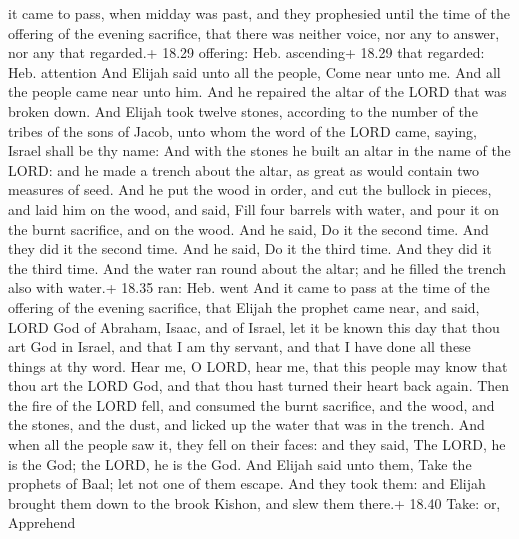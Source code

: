 it came to pass, when midday was past, and they prophesied until the
time of the offering of the evening sacrifice, that there was neither
voice, nor any to answer, nor any that regarded.+ 18.29 offering: Heb.
ascending+ 18.29 that regarded: Heb. attention  And Elijah
said unto all the people, Come near unto me. And all the people came
near unto him. And he repaired the altar of the LORD that was broken
down.  And Elijah took twelve stones, according to the
number of the tribes of the sons of Jacob, unto whom the word of the
LORD came, saying, Israel shall be thy name:  And with the
stones he built an altar in the name of the LORD: and he made a trench
about the altar, as great as would contain two measures of seed.
 And he put the wood in order, and cut the bullock in
pieces, and laid him on the wood, and said, Fill four barrels with
water, and pour it on the burnt sacrifice, and on the wood.
 And he said, Do it the second time. And they did it the
second time. And he said, Do it the third time. And they did it the
third time.  And the water ran round about the altar; and
he filled the trench also with water.+ 18.35 ran: Heb. went
 And it came to pass at the time of the offering of the
evening sacrifice, that Elijah the prophet came near, and said, LORD God
of Abraham, Isaac, and of Israel, let it be known this day that thou art
God in Israel, and that I am thy servant, and that I have done all these
things at thy word.  Hear me, O LORD, hear me, that this
people may know that thou art the LORD God, and that thou hast turned
their heart back again.  Then the fire of the LORD fell,
and consumed the burnt sacrifice, and the wood, and the stones, and the
dust, and licked up the water that was in the trench.  And
when all the people saw it, they fell on their faces: and they said, The
LORD, he is the God; the LORD, he is the God.  And Elijah
said unto them, Take the prophets of Baal; let not one of them escape.
And they took them: and Elijah brought them down to the brook Kishon,
and slew them there.+ 18.40 Take: or, Apprehend

